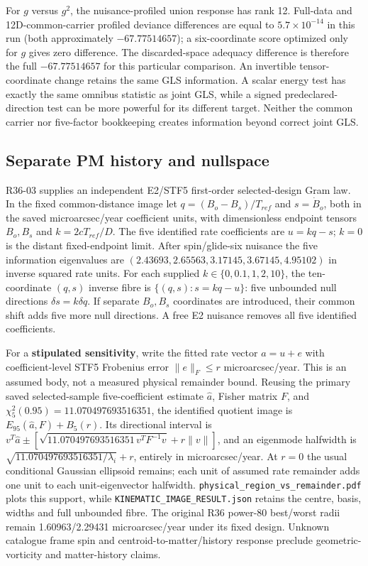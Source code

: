 \documentclass[
]{article}
\begin{document}
For \(g\) versus \(g^2\), the nuisance-profiled union response has rank
12. Full-data and 12D-common-carrier profiled deviance differences are
equal to \(5.7\times10^{-14}\) in this run (both approximately
\(-67.77514657\)); a six-coordinate score optimized only for \(g\) gives
zero difference. The discarded-space adequacy difference is therefore
the full \(-67.77514657\) for this particular comparison. An invertible
tensor-coordinate change retains the same GLS information. A scalar
energy test has exactly the same omnibus statistic as joint GLS, while a
signed predeclared-direction test can be more powerful for its different
target. Neither the common carrier nor five-factor bookkeeping creates
information beyond correct joint GLS.

\hypertarget{separate-pm-history-and-nullspace}{%
\subsection{Separate PM history and
nullspace}\label{separate-pm-history-and-nullspace}}

R36-03 supplies an independent E2/STF5 first-order selected-design Gram
law. In the fixed common-distance image let \(q=(B_o-B_s)/T_{ref}\) and
\(s=\dot B_o\), both in the saved microarcsec/year coefficient units,
with dimensionless endpoint tensors \(B_o,B_s\) and \(k=2cT_{ref}/D\).
The five identified rate coefficients are \(u=kq-s\); \(k=0\) is the
distant fixed-endpoint limit. After spin/glide-six nuisance the five
information eigenvalues are
\((2.43693,2.65563,3.17145,3.67145,4.95102)\) in inverse squared rate
units. For each supplied \(k\in\{0,0.1,1,2,10\}\), the ten-coordinate
\((q,s)\) inverse fibre is \(\{(q,s):s=kq-u\}\): five unbounded null
directions \(\delta s=k\delta q\). If separate \(B_o,B_s\) coordinates
are introduced, their common shift adds five more null directions. A
free E2 nuisance removes all five identified coefficients.

For a \textbf{stipulated sensitivity}, write the fitted rate vector
\(a=u+e\) with coefficient-level STF5 Frobenius error \(\|e\|_F\le r\)
microarcsec/year. This is an assumed body, not a measured physical
remainder bound. Reusing the primary saved selected-sample
five-coefficient estimate \(\hat a\), Fisher matrix \(F\), and
\(\chi^2_5(0.95)=11.070497693516351\), the identified quotient image is
\(E_{95}(\hat a,F)+B_5(r)\). Its directional interval is
\(v^T\hat a\pm[\sqrt{11.070497693516351\,v^TF^{-1}v}+r\|v\|]\), and an
eigenmode halfwidth is \(\sqrt{11.070497693516351/\lambda_i}+r\),
entirely in microarcsec/year. At \(r=0\) the usual conditional Gaussian
ellipsoid remains; each unit of assumed rate remainder adds one unit to
each unit-eigenvector halfwidth.
\texttt{physical\_\allowbreak{}region\_\allowbreak{}vs\_\allowbreak{}remainder.pdf} plots this support, while
\texttt{KINEMATIC\_IMAGE\_RESULT.json} retains the centre, basis, widths
and full unbounded fibre. The original R36 power-80 best/worst radii
remain 1.60963/2.29431 microarcsec/year under its fixed design. Unknown
catalogue frame spin and centroid-to-matter/history response preclude
geometric-vorticity and matter-history claims.
\end{document}
